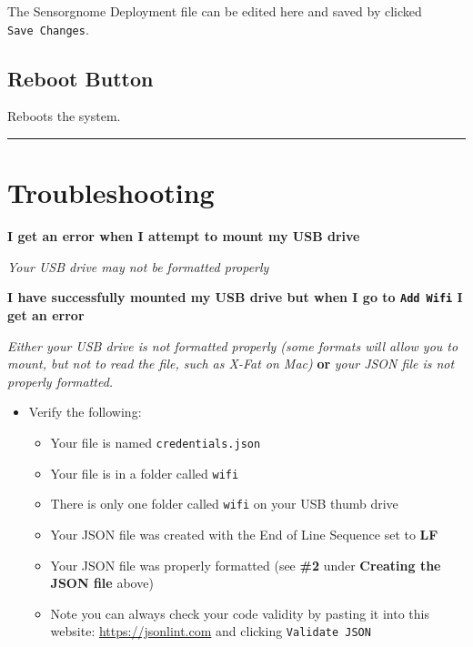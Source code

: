 \documentclass[
]{article}
\providecommand{\tightlist}{%
  \setlength{\itemsep}{0pt}\setlength{\parskip}{0pt}}
\begin{document}
The Sensorgnome Deployment file can be edited here and saved by clicked
\texttt{Save\ Changes}.

\hypertarget{reboot-button}{%
\subsection{Reboot Button}\label{reboot-button}}

Reboots the system.

\begin{center}\rule{0.5\linewidth}{0.5pt}\end{center}

\hypertarget{troubleshooting}{%
\section{Troubleshooting}\label{troubleshooting}}

\textbf{I get an error when I attempt to mount my USB drive}

\emph{Your USB drive may not be formatted properly}

\textbf{I have successfully mounted my USB drive but when I go to
\texttt{Add\ Wifi} I get an error}

\emph{Either your USB drive is not formatted properly (some formats will
allow you to mount, but not to read the file, such as X-Fat on Mac)}
\textbf{or} \emph{your JSON file is not properly formatted.}

\begin{itemize}
\tightlist
\item
  Verify the following:

  \begin{itemize}
  \tightlist
  \item
    Your file is named \texttt{credentials.json}
  \item
    Your file is in a folder called \texttt{wifi}
  \item
    There is only one folder called \texttt{wifi} on your USB thumb
    drive
  \item
    Your JSON file was created with the End of Line Sequence set to
    \textbf{LF}
  \item
    Your JSON file was properly formatted (see \textbf{\#2} under
    \textbf{Creating the JSON file} above)
  \item
    Note you can always check your code validity by pasting it into this
    website: \url{https://jsonlint.com} and clicking
    \texttt{Validate\ JSON}
  \end{itemize}
\end{itemize}
\end{document}
